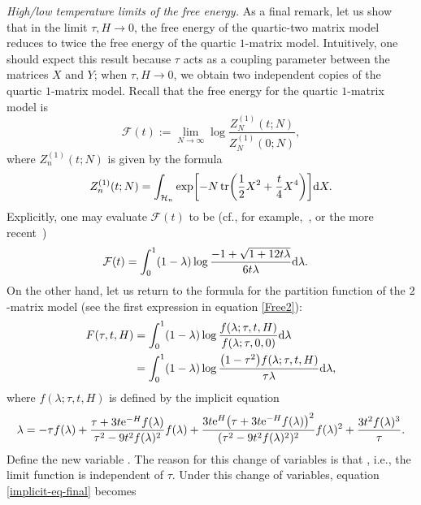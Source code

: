 \documentclass[pdftex]{sigma}
\DeclareMathOperator{\tr}{tr}
\numberwithin{equation}{section}
\begin{document}
\begin{Remark} \textit{High/low temperature limits of the free energy.}
 As a final remark, let us show that in the limit $\tau,H\to 0$, the free energy of the quartic-two matrix model reduces to twice the free energy of the
 quartic $1$-matrix model. Intuitively, one should expect this result because $\tau$ acts as a coupling parameter between the matrices $X$ and $Y$; when
 $\tau,H \to 0$, we obtain two independent copies of the quartic $1$-matrix model. Recall that the free energy for the quartic $1$-matrix model is
 \begin{equation*}
 \mathcal{F}(t) :=\lim_{N\to\infty}\log\frac{Z^{(1)}_{N}(t;N)}{Z^{(1)}_{N}(0;N)},
 \end{equation*}
 where $Z^{(1)}_{n}(t;N)$ is given by the formula
 \begin{equation*}
 Z^{(1)}_{n}(t;N) = \int_{\mathcal{H}_n} \exp\biggl[-N\tr\biggl(\frac{1}{2}X^2 + \frac{t}{4}X^4\biggr) \biggr]{\rm d}X.
 \end{equation*}
 Explicitly, one may evaluate $\mathcal{F}(t)$ to be (cf., for example,~\cite{BIZ}, or the more recent~\cite{BGM})
 \begin{align*}
 &\mathcal{F}(t)= \int_{0}^{1}(1-\lambda)\log \frac{-1 + \sqrt{1+12t\lambda}}{6t\lambda}{\rm d}\lambda.
 \end{align*}
 On the other hand, let us return to the formula for the partition function of the $2$-matrix model (see the first expression in equation \eqref{Free2}):
 \begin{align*}
 F(\tau,t,H) &= \int_{0}^{1}(1-\lambda) \log\frac{f(\lambda;\tau,t,H)}{f(\lambda;\tau,0,0)} {\rm d}\lambda\\
 &=\int_{0}^{1}(1-\lambda) \log\frac{\bigl(1-\tau^2\bigr)f(\lambda;\tau,t,H)}{\tau \lambda} {\rm d}\lambda,
 \end{align*}
 where $f(\lambda;\tau,t,H)$ is defined by the implicit equation
 \begin{equation}\label{implicit-eq-final}
 \lambda = -\tau f(\lambda) + \frac{\tau + 3t{\rm e}^{-H} f(\lambda)}{\tau^2 - 9t^2f(\lambda)^2}f(\lambda) + \frac{3t{\rm e}^{H}\bigl(\tau + 3t{\rm e}^{-H} f(\lambda)\bigr)^2}{(\tau^2 - 9t^2f(\lambda)^2)^2}f(\lambda)^2 + \frac{3t^2f(\lambda)^3}{\tau}.
 \end{equation}
 Define the new variable . The reason for this change of variables is that , i.e., the limit function is independent of $\tau$. Under this change of variables, equation \eqref{implicit-eq-final} becomes

\end{Remark}
\end{document}
